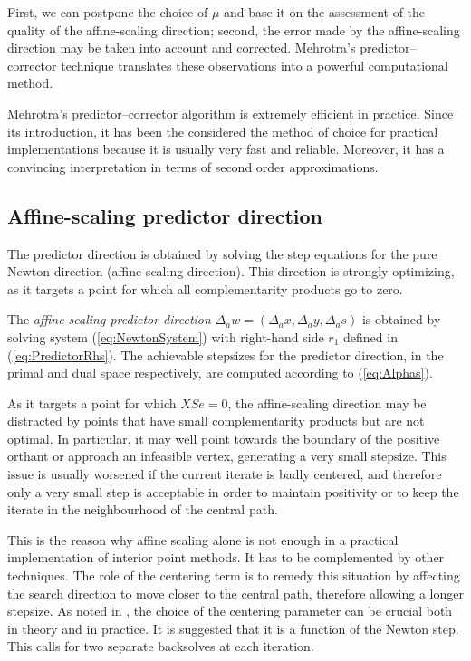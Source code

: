 First, we can postpone the choice of $\mu$ and base it
on the assessment of the quality of the affine-scaling direction;
second, the error made by the affine-scaling direction may be 
taken into account and
corrected. Mehrotra's predictor--corrector technique \cite{Mehrotra92}
translates these observations into a powerful computational method.

Mehrotra's predictor--corrector algorithm \cite{Mehrotra92,LustigMarstenShanno}
is extremely efficient in practice. Since its introduction, it has 
been the considered the method of choice for practical implementations 
because it is usually very fast and reliable. Moreover, it has a 
convincing interpretation in terms of second order approximations.

%
%
\subsection{Affine-scaling predictor direction}

The predictor direction is obtained by solving the step equations 
for the pure Newton direction (affine-scaling direction). This 
direction is strongly optimizing, as it targets a point for which 
all complementarity products go to zero. 

The {\em affine-scaling predictor direction} 
$\Delta_a w = (\Delta_a x, \Delta_a y, \Delta_a s)$ is obtained by solving 
system (\ref{eq:NewtonSystem}) with right-hand side $r_1$ defined 
in (\ref{eq:PredictorRhs}).
The achievable stepsizes for the predictor direction, 
in the primal and dual space respectively, are computed 
according to (\ref{eq:Alphas}).

As it targets a point for which $XSe = 0$, the affine-scaling direction 
may be distracted by points that have small complementarity products 
but are not optimal. 
In particular, it may well point towards the boundary of the 
positive orthant or approach an infeasible vertex, generating 
a very small stepsize. 
This issue is usually worsened if the current iterate is badly centered, 
and therefore only a very small step is acceptable in order to 
maintain positivity or to keep the iterate in the neighbourhood 
of the central path.

This is the reason why affine scaling alone is not enough in a 
practical implementation of interior point methods. It has to be 
complemented by other techniques.
The role of the centering term is to remedy this situation by 
affecting the search direction to move closer to the central path, 
therefore allowing a longer stepsize. 
As noted in \cite{TapiaZhangSaltzmanWeiser}, the choice of the 
centering parameter can be crucial both in theory and in practice. 
It is suggested that it is a function of the Newton step. 
This calls for two separate backsolves at each iteration.

